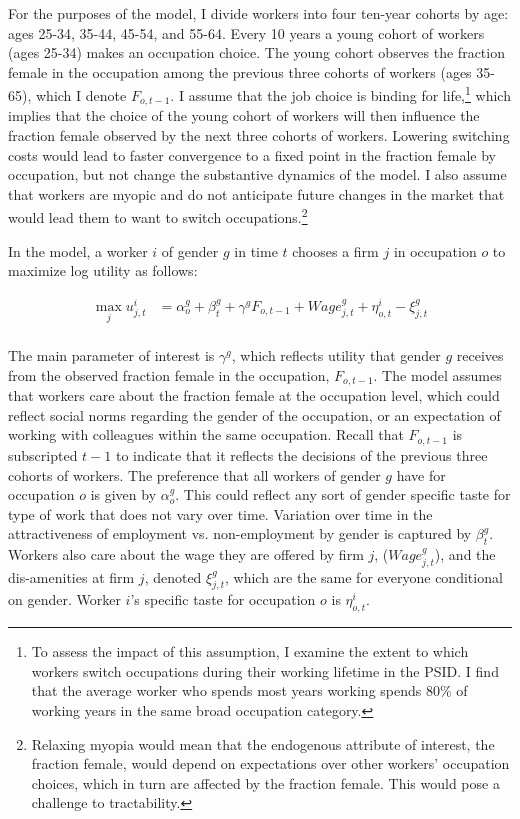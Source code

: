 \documentclass[12pt]{article}
\begin{document}
For the purposes of the model, I divide workers into four ten-year cohorts by age: ages 25-34, 35-44, 45-54, and 55-64. Every 10 years a young cohort of workers (ages 25-34) makes an occupation choice. The young cohort observes the fraction female in the occupation among the previous three cohorts of workers (ages 35-65), which I denote $F_{o,t-1}$. I assume that the job choice is binding for life,\footnote{To assess the impact of this assumption, I examine the extent to which workers switch occupations during their working lifetime in the PSID. I find that the average worker who spends most years working spends 80\% of working years in the same broad occupation category.} which implies that the choice of the young cohort of workers will then influence the fraction female observed by the next three cohorts of workers. Lowering switching costs would lead to faster convergence to a fixed point in the fraction female by occupation, but not change the substantive dynamics of the model. I also assume that workers are myopic and do not anticipate future changes in the market that would lead them to want to switch occupations.\footnote{Relaxing myopia would mean that the endogenous attribute of interest, the fraction female, would depend on expectations over other workers' occupation choices, which in turn are affected by the fraction female. This would pose a challenge to tractability.}

In the model, a worker $i$ of gender $g$ in time $t$ chooses a firm $j$ in occupation $o$ to maximize log utility as follows:

\begin{align} \label{logworker}
\max_{j } u^i_{j,t} &=  \alpha^g_{o}+ \beta^g_t  +  \gamma^g F_{o,t-1}   + Wage^g_{j,t} + \eta^i_{o,t} - \xi^g_{j,t}  \\ \nonumber
\end{align}



The main parameter of interest is $\gamma^g $, which reflects utility that gender $g$ receives from the observed fraction female in the occupation, $F_{o,t-1}$. The model assumes that workers care about the fraction female at the occupation level, which could reflect social norms regarding the gender of the occupation, or an expectation of working with colleagues within the same occupation. Recall that $F_{o,t-1}$ is subscripted $t-1$ to indicate that it reflects the decisions of the previous three cohorts of workers. The preference that all workers of gender $g$ have for occupation $o$ is given by $\alpha^g_o$. This could reflect any sort of gender specific taste for type of work that does not vary over time. Variation over time in the attractiveness of employment vs. non-employment by gender is captured by $\beta^g_t $. Workers also care about the wage they are offered by firm $j$, ($Wage^g_{j,t}$), and the dis-amenities at firm $j$, denoted $\xi^g_{j,t}$, which are the same for everyone conditional on gender. Worker $i$'s specific taste for occupation $o$ is $\eta^i_{o,t}$. 
\end{document}

